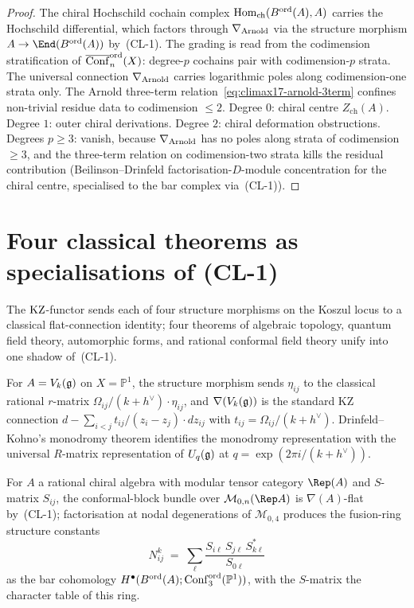 \begin{proof}
The chiral Hochschild cochain complex $\mathrm{Hom}_{\mathrm{ch}}(B^{\mathrm{ord}}(A),A)$
carries the Hochschild differential, which factors through $\nabla_{\mathrm{Arnold}}$ via
the structure morphism $A\to\End(\Bord(A))$ by~\textup{(CL-1)}. The
grading is read from the codimension stratification of
$\overline{\operatorname{Conf}}_n^{\mathrm{ord}}(X)$: degree-$p$ cochains pair with
codimension-$p$ strata. The universal connection $\nabla_{\mathrm{Arnold}}$ carries
logarithmic poles along codimension-one strata only. The Arnold
three-term relation~\eqref{eq:climax17-arnold-3term} confines
non-trivial residue data to codimension $\leq 2$. Degree $0$:
chiral centre $Z_{\mathrm{ch}}(A)$. Degree $1$: outer chiral
derivations. Degree $2$: chiral deformation obstructions. Degrees
$p\geq 3$: vanish, because $\nabla_{\mathrm{Arnold}}$ has no poles along strata of
codimension $\geq 3$, and the three-term relation on codimension-two
strata kills the residual contribution (Beilinson--Drinfeld
factorisation-$D$-module concentration for the chiral centre,
specialised to the bar complex via~\textup{(CL-1)}).
\end{proof}

\section{Four classical theorems as specialisations of (CL-1)}
\label{sec:climax17-classical}

The $\mathrm{KZ}$-functor sends each of four structure morphisms on the
Koszul locus to a classical flat-connection identity; four theorems
of algebraic topology, quantum field theory, automorphic forms, and
rational conformal field theory unify into one shadow of~\textup{(CL-1)}.

\begin{corollary}
\label{cor:climax17-drinfeld-kohno}
\ClaimStatusProvedHere
For $A=V_k(\mathfrak{g})$ on $X=\mathbb{P}^1$, the structure morphism sends
$\eta_{ij}$ to the classical rational $r$-matrix
$\Omega_{ij}/(k+h^\vee)\cdot\eta_{ij}$, and $\nabla(V_k(\mathfrak{g}))$ is the
standard KZ connection $d-\sum_{i<j}t_{ij}/(z_i-z_j)\cdot dz_{ij}$
with $t_{ij}=\Omega_{ij}/(k+h^\vee)$. Drinfeld--Kohno's monodromy
theorem identifies the monodromy representation with the universal
$R$-matrix representation of $U_q(\mathfrak{g})$ at
$q=\exp(2\pi i/(k+h^\vee))$.
\end{corollary}

\begin{corollary}[Verlinde]
\label{cor:climax17-verlinde}
\ClaimStatusProvedHere
For $A$ a rational chiral algebra with modular tensor category
$\Rep(A)$ and $S$-matrix $S_{ij}$, the conformal-block bundle over
$\mathcal{M}_{0,n}(\Rep A)$ is $\nabla(A)$-flat by~\textup{(CL-1)};
factorisation at nodal degenerations of $\mathcal{M}_{0,4}$ produces
the fusion-ring structure constants
\[
  N_{ij}^{k}\;=\;\sum_{\ell}\frac{S_{i\ell}\,S_{j\ell}\,S^*_{k\ell}}{S_{0\ell}}
\]
as the bar cohomology
$H^\bullet(B^{\mathrm{ord}}(A);\operatorname{Conf}_3^{\mathrm{ord}}(\mathbb{P}^1))$, with the
$S$-matrix the character table of this ring.
\end{corollary}

